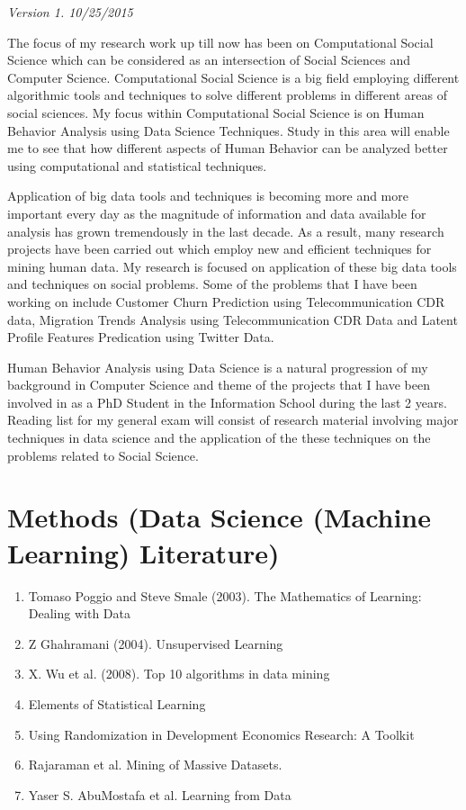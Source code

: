 \textit{Version 1. 10/25/2015} 

The focus of my research work up till now has been on Computational Social Science which can be considered as an intersection of Social Sciences and Computer Science. Computational Social Science is a big field employing different algorithmic tools and techniques to solve different problems in different areas of social sciences. My focus within Computational Social Science is on Human Behavior Analysis using Data Science Techniques. Study in this area will enable me to see that how different aspects of Human Behavior can be analyzed better using computational and statistical techniques.

Application of big data tools and techniques is becoming more and more important every day as the magnitude of information and data available for analysis has grown tremendously in the last decade. As a result, many research projects have been carried out which employ new and efficient techniques for mining human data. My research is focused on application of these big data tools and techniques on social problems. Some of the problems that I have been working on include Customer Churn Prediction using Telecommunication CDR data, Migration Trends Analysis using Telecommunication CDR Data  and Latent Profile Features Predication using Twitter Data.

Human Behavior Analysis using Data Science is a natural progression of my background in Computer Science and theme of the projects that I have been involved in as a PhD Student in the Information School during the last 2 years. 
Reading list for my general exam will consist of research material involving major techniques in data science and the application of the these techniques on the problems related to Social Science. 

\section{Methods (Data Science (Machine Learning) Literature)}
\begin{enumerate}
\item Tomaso Poggio and Steve Smale (2003). The Mathematics of Learning: Dealing with Data\cite{Poggio_2005}
\item Z Ghahramani (2004). Unsupervised Learning \cite{Ghahramani_2004}
\item X. Wu et al. (2008). Top 10 algorithms in data mining \cite{2009}
\item Elements of Statistical Learning \cite{StatisticalLearning_2009}
\item Using Randomization in Development Economics Research: A Toolkit \cite{Duflo} 
\item Rajaraman et al. Mining of Massive Datasets. \cite{Rajaraman_2009}
\item Yaser S. AbuMostafa et al. Learning from Data \cite{Abu-Mostafa:2012:LD:2207825}
\end{enumerate}

